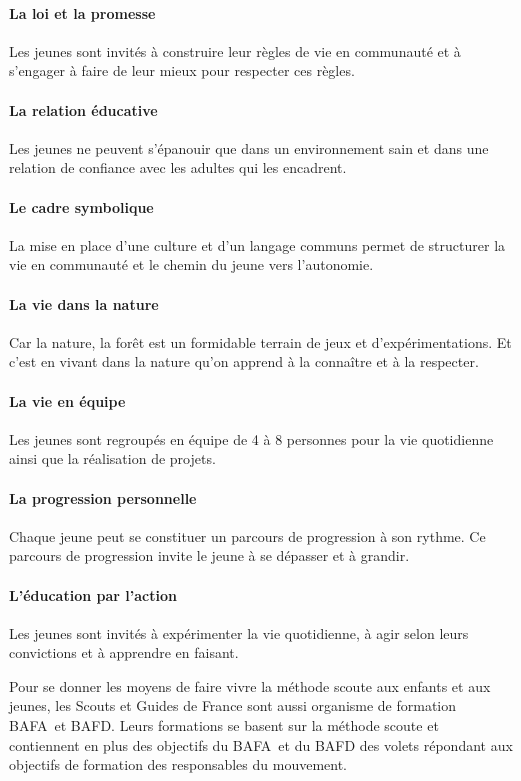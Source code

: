 \documentclass[titlepage,11pt,a4paper]{article}
\begin{document}
\paragraph{La loi et la promesse} Les jeunes sont invités à construire leur règles de vie
en communauté et à s'engager à faire de leur mieux pour respecter ces règles.

\paragraph{La relation éducative} Les jeunes ne peuvent s'épanouir que dans un
environnement sain et dans une relation de confiance avec les adultes qui les encadrent.

\paragraph{Le cadre symbolique} La mise en place d'une culture et d'un langage communs
permet de structurer la vie en communauté et le chemin du jeune vers l'autonomie.

\paragraph{La vie dans la nature} Car la nature, la forêt est un formidable terrain de jeux
et d'expérimentations. Et c'est en vivant dans la nature qu'on apprend à la connaître et à
la respecter.

\paragraph{La vie en équipe} Les jeunes sont regroupés en équipe de 4 à 8 personnes pour
la vie quotidienne ainsi que la réalisation de projets.

\paragraph{La progression personnelle} Chaque jeune peut se constituer un parcours
de progression à son rythme. Ce parcours de progression invite le jeune à se dépasser et à
grandir.

\paragraph{L'éducation par l'action} Les jeunes sont invités à expérimenter la vie
quotidienne, à agir selon leurs convictions et à apprendre en faisant.

Pour se donner les moyens de faire vivre la méthode scoute aux enfants et aux jeunes, les
Scouts et Guides de France sont aussi organisme de formation BAFA et BAFD. Leurs
formations se basent sur la méthode scoute et contiennent en plus des objectifs du BAFA et
du BAFD des volets répondant aux objectifs de formation des responsables du mouvement.
\end{document}
